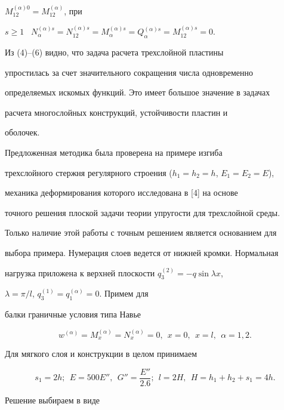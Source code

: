 $M^{(\alpha)0}_{12}=M^{(\alpha)}_{12}$, при 


$s\ge1$ \ $N^{(\alpha)s}_\alpha= N^{(\alpha)s}_{12}= 


M^{(\alpha)s}_\alpha= Q^{(\alpha)s}_\alpha= M^{(\alpha)s}_{12}=0$. 


 


Из (4)--(6) видно, что задача расчета трехслойной пластины 


упростилась за счет значительного сокращения числа одновременно 


определяемых искомых функций. Это имеет большое значение в задачах 


расчета многослойных конструкций, устойчивости пластин и 


оболочек. 


 


Предложенная методика была проверена на примере изгиба 


трехслойного стержня регулярного строения ($h_1=h_2=h$, $E_1=E_2=E$), 


механика деформирования которого исследована в [4] на основе 


точного решения плоской задачи теории упругости для трехслойной среды. 


Только наличие этой работы с точным решением является основанием для 


выбора примера. Нумерация слоев ведется от нижней кромки. Нормальная 


нагрузка приложена к верхней плоскости $q^{(2)}_3=-q\sin\lambda x$, 


$\lambda=\pi/l$, $q^{(1)}_3=q^{(\alpha)}_1=0$. Примем для 


балки граничные условия типа Навье 


$$ 


w^{(\alpha)}=M^{(\alpha)}_x=N^{(\alpha)}_x=0,


\ \ x=0,\ \ x=l,\ \ \alpha=1,2. 


$$ 


Для мягкого слоя и конструкции в целом принимаем 


$$ 


s_1=2h;\ \ E=500E'',\ \ G''=\frac{E''}{2.6};\ \ l=2H, 


\ \ H=h_1+h_2+s_1=4h. 


$$ 


 


Решение выбираем в виде 


